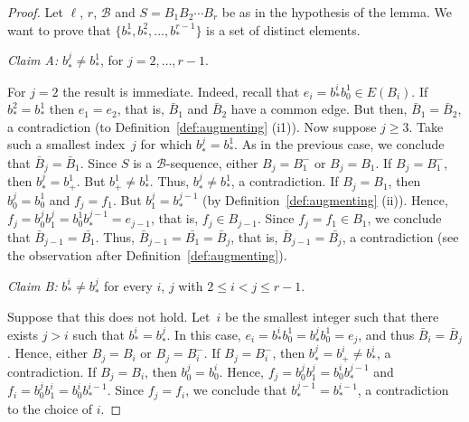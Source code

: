 \documentclass[12pt,reqno,a4paper]{amsart}
\newcommand{\B}{\mathcal{B}}
\begin{document}
\begin{proof}
  Let \(\ell\), $r$, $\B$ and \(S = B_1B_2\cdots B_r\)
  be as in the hypothesis of the lemma.  We want to prove that
  \(\{b^1_{*},b^2_{*}, \ldots, b^{r-1}_{*}\}\) is a set of distinct elements.

\smallskip
	
\noindent\emph{Claim A:} $b^{j}_{*}\neq b^1_{*}$, for  $j=2,\ldots,r-1$.

For $j=2$ the result is immediate. Indeed, recall that
$e_i= b_{*}^ib_0^1 \in E(B_i)$.  If $b_{*}^2 = b_{*}^1$ then
$e_1=e_2$, that is, $\bar B_1$ and $\bar B_2$ have a common edge.  But
then, $\bar B_1 = \bar B_2$, a contradiction (to Definition~\ref{def:augmenting} (i1)). 
%
Now suppose $j\geq 3$. Take such a smallest index~$j$ for which
$b^{j}_{*} = b^1_{*}$. As in the previous case, we conclude that 
$\bar B_j = \bar B_1$. Since $S$ is a \(\B\)-sequence, 
either \(B_{j} = B_1^-\)  or $B_j = B_1$.
%
If \(B_{j} = B_1^-\), then $b_{*}^j = b_{+}^1$. But $b_{+}^1\neq
b_{*}^1$.  Thus, $b_{*}^j \neq b_{*}^1$, a contradiction. 
%
If \(B_{j} = B_1\), then  $b_0^j =b_0^1$  and
$f_j = f_1$.  But $b_1^j = b_{*}^{j-1}$ (by Definition~\ref{def:augmenting}
(ii)). Hence, $f_j = b_0^jb_1^j=b_0^1b_{*}^{j-1} = e_{j-1}$, that is, $f_j \in 
B_{j-1}$. Since $f_j=f_1 \in B_1$, we conclude that $\bar B_{j-1} =
\bar{B_1}$. Thus,  $\bar B_{j-1} = \bar{B_1}=\bar B_{j}$, that is, $\bar
B_{j-1} = \bar{B_j}$, a contradiction (see the observation after
Definition~\ref{def:augmenting}). 

\smallskip

\noindent\emph{Claim B:}  $b^{i}_{*}\neq b^{j}_{*}$ for every $i$, $j$
with $2\leq i< j\leq r-1$. 

Suppose that this does not hold. Let~$i$ be the
smallest integer such that there exists $j>i$ such that
$b^{i}_{*} = b^{j}_{*}$. 
In this case, $e_i=b_{*}^ib_0^1 = b_{*}^jb_0^1 = e_j$,
and thus $\bar B_i = \bar B_j$. Hence, either $B_j = B_i$ or $B_j =
B_i^-$. If $B_j=B_i^-$, then $b_{*}^j = b_{+}^i \neq b_{*}^i$, a
contradiction. If  $B_j=B_i$, then $b_0^j = b_0^i$. Hence, 
$f_j = b_0^jb_1^j = b_0^ib_{*}^{j-1}$ and 
$f_i = b_0^jb_1^i = b_0^ib_{*}^{i-1}$. Since $f_j=f_i$, we
conclude that $b_{*}^{j-1} = b_{*}^{i-1}$, a contradiction to the
choice of $i$. 
\end{proof}
\end{document}
